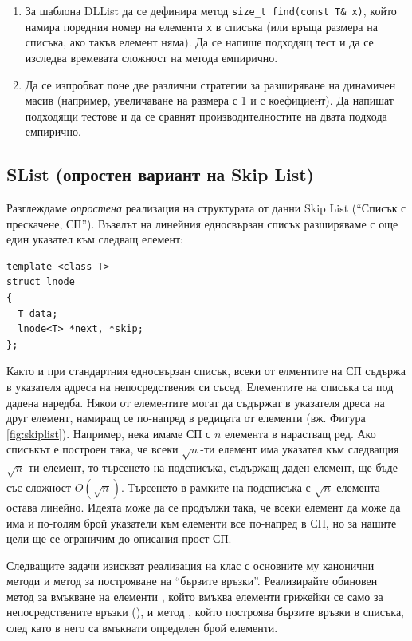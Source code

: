 \begin{enumerate}[resume]

\item За шаблона DLList да се дефинира метод \texttt{size\_t find(const T\& x)}, който намира поредния номер на елемента \texttt{x} в списъка (или връща размера на списъка, ако такъв елемент няма). Да се напише подходящ тест и да се изследва времевата сложност на метода емпирично.

\item Да се изпробват поне две различни стратегии за разширяване на динамичен масив (например, увеличаване на размера с 1 и с коефициент). Да напишат подходящи тестове и да се сравнят производителностите на двата подхода емпирично.

\end{enumerate}


\subsection{SList (опростен вариант на Skip List)}

\begin{mdframed}[hidealllines=true,backgroundcolor=gray!20]
Разглеждаме \emph{опростена} реализация на структурата от данни Skip List (``Списък с прескачене, СП''). Възелът на линейния едносвързан списък разширяваме с още един указател към следващ елемент:

\begin{verbatim}
template <class T>
struct lnode
{
  T data;
  lnode<T> *next, *skip;
};
\end{verbatim}
Както и при стандартния едносвързан списък, всеки от елментите на СП съдържа в указателя  адреса на непосредствения си съсед. Елементите на списъка са под дадена наредба. Някои от елементите могат да съдържат в указателя  дреса на друг елемент, намиращ се по-напред в редицата от елементи (вж. Фигура \ref{fig:skiplist}). Например, нека имаме СП с $n$ елемента в нарастващ ред. Ако списъкът е построен така, че всеки $\sqrt{n}$-ти елемент има указател към следващия  $\sqrt{n}$-ти елемент, то търсенето на подсписъка, съдържащ даден елемент, ще бъде със сложност $O(\sqrt{n})$. Търсенето в рамките на подсписъка с $\sqrt{n}$ елемента остава линейно. Идеята може да се продължи така, че всеки елемент да може да има и по-голям брой указатели към елементи все по-напред в СП, но за нашите цели ще се ограничим до описания прост СП.

Следващите задачи изискват реализация на клас  с основните му канонични методи и метод за построяване на ``бързите връзки''. Реализирайте обиновен метод за вмъкване на елементи , който вмъква елементи грижейки се само за непосредствените връзки (), и метод , който построява бързите връзки в списъка, след като в него са вмъкнати определен брой елементи.
\end{mdframed}

